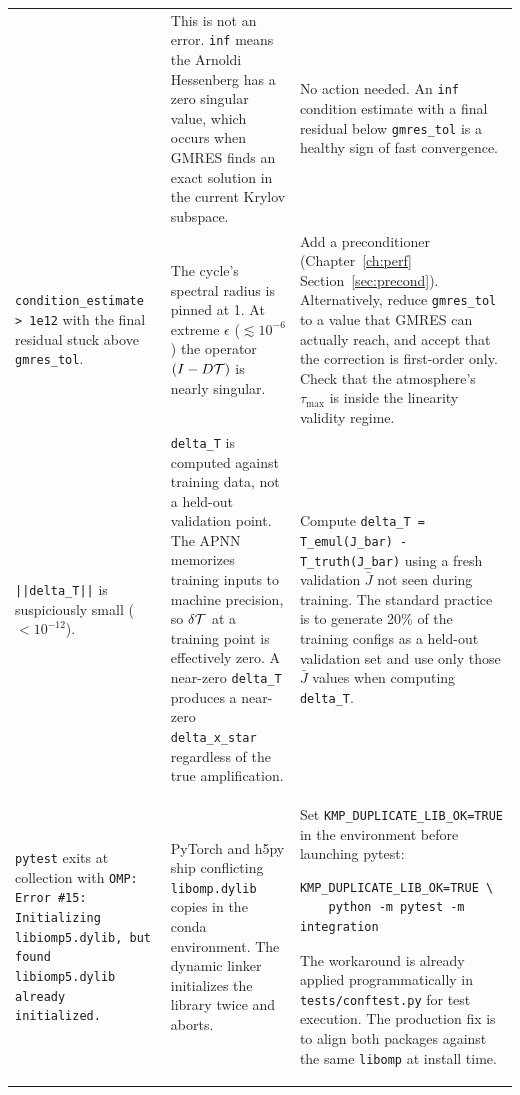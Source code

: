 \begin{longtable}{p{} p{} p{}}
&
\raggedright\arraybackslash
This is not an error.
\texttt{inf} means the Arnoldi Hessenberg has a zero singular value,
which occurs when GMRES finds an exact solution in the current Krylov
subspace.
&
\raggedright\arraybackslash
No action needed.
An \texttt{inf} condition estimate with a final residual below
\texttt{gmres\_tol} is a healthy sign of fast convergence.
\\
\raggedright\arraybackslash
\texttt{condition\_estimate > 1e12} with the final residual stuck above
\texttt{gmres\_tol}.
&
\raggedright\arraybackslash
The cycle's spectral radius is pinned at 1.
At extreme $\epsilon$ ($\lesssim 10^{-6}$) the operator
$(I - D\mathcal{T})$ is nearly singular.
&
\raggedright\arraybackslash
Add a preconditioner (Chapter~\ref{ch:perf} Section~\ref{sec:precond}).
Alternatively, reduce \texttt{gmres\_tol} to a value that GMRES can
actually reach, and accept that the correction is first-order only.
Check that the atmosphere's $\tau_\mathrm{max}$ is inside the linearity
validity regime.
\\
\raggedright\arraybackslash
\texttt{||delta\_T||} is suspiciously small ($< 10^{-12}$).
&
\raggedright\arraybackslash
\texttt{delta\_T} is computed against training data, not a held-out
validation point.
The APNN memorizes training inputs to machine precision, so
$\delta\mathcal{T}$ at a training point is effectively zero.
A near-zero \texttt{delta\_T} produces a near-zero \texttt{delta\_x\_star}
regardless of the true amplification.
&
\raggedright\arraybackslash
Compute \texttt{delta\_T = T\_emul(J\_bar) - T\_truth(J\_bar)} using a
fresh validation $\bar{J}$ not seen during training.
The standard practice is to generate 20\% of the training configs as a
held-out validation set and use only those $\bar{J}$ values when
computing \texttt{delta\_T}.
\\
\raggedright\arraybackslash
\texttt{pytest} exits at collection with
\texttt{OMP: Error \#15: Initializing libiomp5.dylib, but found
libiomp5.dylib already initialized.}
&
\raggedright\arraybackslash
PyTorch and h5py ship conflicting \texttt{libomp.dylib} copies in the
conda environment.
The dynamic linker initializes the library twice and aborts.
&
\raggedright\arraybackslash
Set \texttt{KMP\_DUPLICATE\_LIB\_OK=TRUE} in the environment before
launching pytest:
\begin{lstlisting}[style=grailInStyle]
KMP_DUPLICATE_LIB_OK=TRUE \
    python -m pytest -m integration
\end{lstlisting}
The workaround is already applied programmatically in
\texttt{tests/conftest.py} for test execution.
The production fix is to align both packages against the same
\texttt{libomp} at install time.
\\

\bottomrule
\end{longtable}

